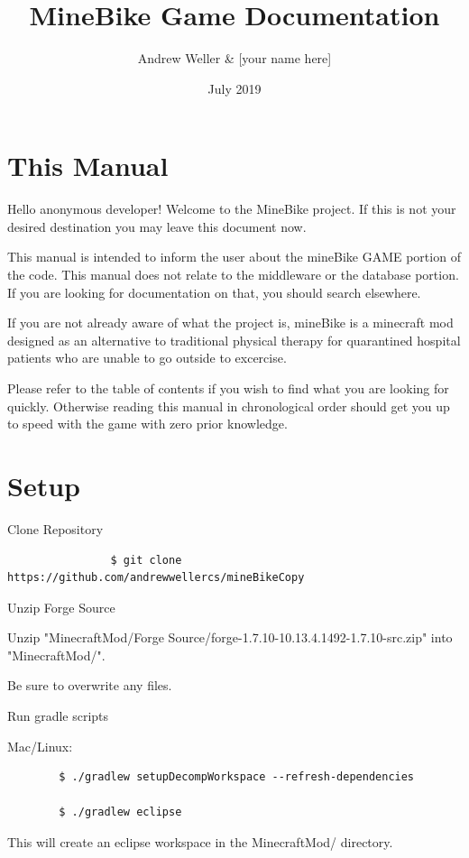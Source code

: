 \documentclass[12pt]{article}
\title{MineBike Game Documentation}
\author{Andrew Weller \& [your name here]}
\date{July 2019}
\begin{document}
\maketitle

\tableofcontents

\section{This Manual}
Hello anonymous developer! Welcome to the MineBike project. If this is not your desired destination you may leave this document now.

This manual is intended to inform the user about the mineBike GAME portion of the code. This manual does not relate to the middleware or the database portion.
If you are looking for documentation on that, you should search elsewhere.

If you are not already aware of what the project is, mineBike is a minecraft mod designed as an alternative to traditional physical therapy for quarantined hospital patients who are unable to go outside to excercise. 

Please refer to the table of contents if you wish to find what you are looking for quickly. Otherwise reading this manual in chronological order should get you up to speed with the game with zero prior knowledge.

\section {Setup}
\begin{steps}
  \item Clone Repository
		\begin{verbatim}
				$ git clone https://github.com/andrewwellercs/mineBikeCopy
		\end{verbatim}

  \item Unzip Forge Source

		Unzip "MinecraftMod/Forge Source/forge-1.7.10-10.13.4.1492-1.7.10-src.zip" into "MinecraftMod/".

		Be sure to overwrite any files.

  \item Run gradle scripts

		Mac/Linux:
	\begin{verbatim}
		$ ./gradlew setupDecompWorkspace --refresh-dependencies
		
		$ ./gradlew eclipse
	\end{verbatim}

	This will create an eclipse workspace in the MinecraftMod/ directory.

  \item 


\end{steps}
\end{document}
